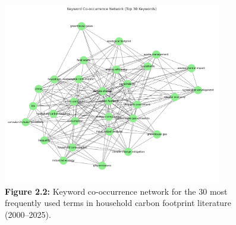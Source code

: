 \documentclass[12pt,a4paper]{article}%
\begin{document}
\begin{figure}[htbp]
    \centering
    \includegraphics[width=0.85\textwidth]{keyword_cooccurrence.png}
    \caption*{\textbf{Figure 2.2: }Keyword co-occurrence network for the 30 most frequently used terms in household carbon footprint literature (2000–2025).}
\end{figure}
\end{document}
